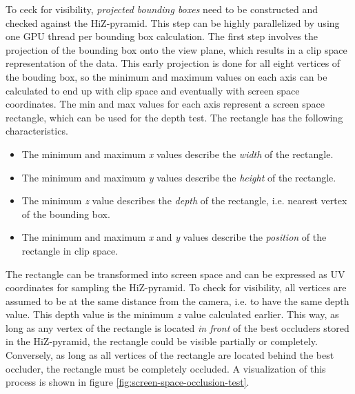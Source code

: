 \noindent
To ceck for visibility, \emph{projected bounding boxes} need to be constructed and checked against the 
\ac{HiZ}-pyramid. This step can be highly parallelized by using one \ac{GPU} thread per bounding box calculation. 
The first step involves the projection of the bounding box onto the view plane, which results in a clip space 
representation of the data. This early projection is done for all eight vertices of the bouding box, so the minimum 
and maximum values on each axis can be calculated to end up with clip space and eventually with screen space coordinates.
The min and max values for each axis represent a screen space rectangle, which can be used for the depth test. The 
rectangle has the following characteristics.

\begin{itemize}
    \item The minimum and maximum \emph{x} values describe the \emph{width} of the rectangle.
    \item The minimum and maximum \emph{y} values describe the \emph{height} of the rectangle.
    \item The minimum \emph{z} value describes the \emph{depth} of the rectangle, i.e. nearest vertex of the bounding box.
    \item The minimum and maximum \emph{x} and \emph{y} values describe the \emph{position} of the rectangle in clip space.
\end{itemize}

The rectangle can be transformed into screen space and can be expressed as UV coordinates for sampling the 
\ac{HiZ}-pyramid. To check for visibility, all vertices are assumed to be at the same distance from the camera,
i.e. to have the same depth value. This depth value is the minimum \emph{z} value calculated earlier. This way,
as long as any vertex of the rectangle is located \emph{in front} of the best occluders stored in the 
\ac{HiZ}-pyramid, the rectangle could be visible partially or completely. Conversely, as long as all vertices of 
the rectangle are located behind the best occluder, the rectangle must be completely occluded. A visualization of 
this process is shown in figure \ref{fig:screen-space-occlusion-test}.

